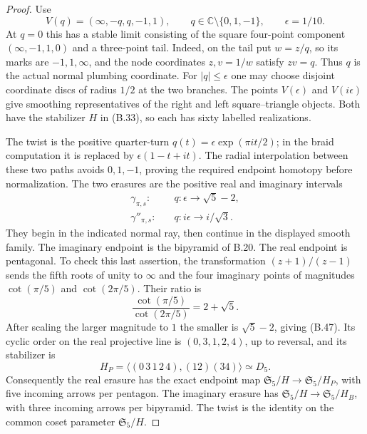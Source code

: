 \begin{proof}
Use
\[
 V(q)=(\infty,-q,q,-1,1),\qquad
 q\in\mathbb C\setminus\{0,1,-1\},\qquad
 \epsilon=1/10.                                      \tag{B.46}
\]
At $q=0$ this has a stable limit consisting of the square
four-point component $(\infty,-1,1,0)$ and a three-point
tail.  Indeed, on the tail put $w=z/q$, so its marks are
$-1,1,\infty$, and the node coordinates $z,v=1/w$ satisfy
$zv=q$.  Thus $q$ is the actual normal plumbing coordinate.
For $|q|\leq\epsilon$ one may choose disjoint coordinate
discs of radius $1/2$ at the two branches.  The points
$V(\epsilon)$ and $V(i\epsilon)$ give smoothing
representatives of the right and left square--triangle
objects.  Both have the stabilizer $H$ in (B.33), so each
has sixty labelled realizations.

The twist is the positive quarter-turn
$q(t)=\epsilon\exp(\pi it/2)$; in the braid computation it
is replaced by
$\epsilon(1-t+it)$.  The radial interpolation between these
two paths avoids $0,1,-1$, proving the required endpoint
homotopy before normalization.  The two erasures are the
positive real and imaginary intervals
\[
\begin{split}
 \gamma_{\pi,s}:&\quad
  q:\epsilon\longrightarrow\sqrt5-2,\\
 \gamma''_{\pi,s}:&\quad
  q:i\epsilon\longrightarrow i/\sqrt3.
\end{split}                                                     \tag{B.47}
\]
They begin in the indicated normal ray, then continue
in the displayed smooth family.  The imaginary endpoint
is the bipyramid of B.20.  The real endpoint is pentagonal.
To check this last assertion, the transformation
$(z+1)/(z-1)$ sends the fifth roots of unity to $\infty$
and the four imaginary points of magnitudes
$\cot(\pi/5)$ and $\cot(2\pi/5)$.  Their ratio is
\[
 \frac{\cot(\pi/5)}{\cot(2\pi/5)}=2+\sqrt5.
\]
After scaling the larger magnitude to $1$ the smaller
is $\sqrt5-2$, giving (B.47).  Its cyclic order on the
real projective line is $(0,3,1,2,4)$, up to reversal,
and its stabilizer is
\[
 H_P=\langle(0\,3\,1\,2\,4),(12)(34)\rangle\simeq D_5.
\tag{B.48}
\]
Consequently the real erasure has the exact endpoint map
$\mathfrak S_5/H\to\mathfrak S_5/H_P$, with five incoming
arrows per pentagon.  The imaginary erasure has
$\mathfrak S_5/H\to\mathfrak S_5/H_B$, with three incoming
arrows per bipyramid.  The twist is the identity on the
common coset parameter $\mathfrak S_5/H$.


\end{proof}

